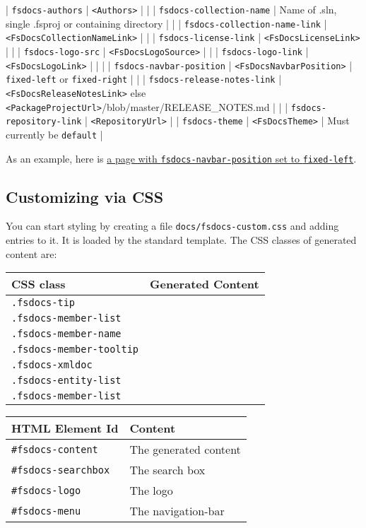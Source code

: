 \documentclass{article}
\begin{document}
| \texttt{fsdocs-authors}              | \texttt{<Authors>}                                                   |  |
| \texttt{fsdocs-collection-name}      | Name of .sln, single .fsproj or containing directory          |  |
| \texttt{fsdocs-collection-name-link} | \texttt{<FsDocsCollectionNameLink>}        |  |
| \texttt{fsdocs-license-link}         | \texttt{<FsDocsLicenseLink>}  | |
| \texttt{fsdocs-logo-src}             | \texttt{<FsDocsLogoSource>} |  |
| \texttt{fsdocs-logo-link}            | \texttt{<FsDocsLogoLink>}   |    |            |
| \texttt{fsdocs-navbar-position}      | \texttt{<FsDocsNavbarPosition>}  |   \texttt{fixed-left} or \texttt{fixed-right}     |  |
| \texttt{fsdocs-release-notes-link}   | \texttt{<FsDocsReleaseNotesLink>} else \texttt{<PackageProjectUrl>}/blob/master/RELEASE\_NOTES.md  | |
| \texttt{fsdocs-repository-link}      | \texttt{<RepositoryUrl>}                                             |
| \texttt{fsdocs-theme}                | \texttt{<FsDocsTheme>}  |  Must currently be \texttt{default}    |


As an example, here is \href{templates/leftside/styling.html}{a page with \texttt{fsdocs-navbar-position} set to \texttt{fixed-left}}.
\subsection*{Customizing via CSS}



You can start styling by creating a file \texttt{docs/fsdocs-custom.css} and adding entries to it.  It is loaded by
the standard template.  The CSS classes of generated content are:
\begin{tabular}{|l|l|}\hline
\textbf{CSS class} & \textbf{Generated Content}\\ \hline\hline
\texttt{.fsdocs-tip} & \\ \hline
\texttt{.fsdocs-member-list} & \\ \hline
\texttt{.fsdocs-member-name} & \\ \hline
\texttt{.fsdocs-member-tooltip} & \\ \hline
\texttt{.fsdocs-xmldoc} & \\ \hline
\texttt{.fsdocs-entity-list} & \\ \hline
\texttt{.fsdocs-member-list} & \\ \hline
\end{tabular}

\begin{tabular}{|l|l|}\hline
\textbf{HTML Element Id} & \textbf{Content}\\ \hline\hline
\texttt{\#fsdocs-content} & The generated content\\ \hline
\texttt{\#fsdocs-searchbox} & The search box\\ \hline
\texttt{\#fsdocs-logo} & The logo\\ \hline
\texttt{\#fsdocs-menu} & The navigation-bar\\ \hline
\end{tabular}
\end{document}
